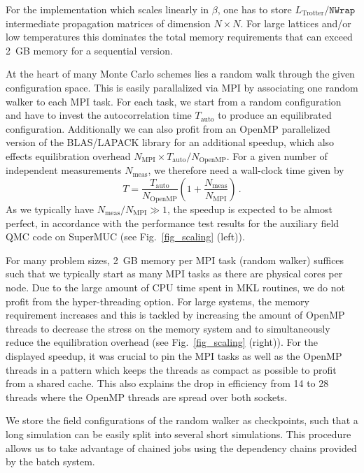 For the implementation which scales linearly in $\beta$, one has to store $L_{\text{Trotter}}/\texttt{NWrap}$ intermediate propagation matrices of dimension $N\times N$. For large lattices and/or low temperatures this dominates the total memory requirements that can exceed 2~GB memory for a sequential version.

At the heart of many Monte Carlo schemes lies a random walk through the given configuration space. This is easily parallalized via MPI by associating one random walker to each MPI task. For each task, we start from a random configuration and have to invest the autocorrelation time $T_\mathrm{auto}$ to produce an equilibrated configuration.
Additionally we can also profit from an OpenMP parallelized version of the BLAS/LAPACK library for an additional speedup, which also effects equilibration overhead $N_\text{MPI}\times T_\text{auto} / N_\text{OpenMP}$. For a given number of independent measurements  $N_\text{meas}$, we  therefore need a wall-clock time given by
\begin{equation}\label{eqn:scaling}
T  =  \frac{T_\text{auto}}{N_\text{OpenMP}} \left( 1   +    \frac{N_\text{meas}}{N_\text{MPI}}  \right) \,.
\end{equation}
As we typically have $ N_\text{meas}/N_\text{MPI} \gg 1 $, 
the speedup is expected to be almost perfect, in accordance with
the performance test results for the auxiliary field
QMC code  on SuperMUC (see Fig.~\ref{fig_scaling} (left)).

For many problem sizes, 2~GB memory per MPI task (random walker) suffices such that we typically start as many MPI tasks as there are physical cores per node. Due to the large amount of CPU time spent in MKL routines, we do not profit from the hyper-threading option. For large systems, the memory requirement increases and this is tackled by increasing the amount of OpenMP threads to decrease the stress on the memory system and to simultaneously reduce the equilibration overhead (see Fig.~\ref{fig_scaling} (right)). For the displayed speedup, it was crucial to pin the MPI tasks as well as the OpenMP threads in a pattern which keeps the threads as compact as possible to profit from a shared cache. This also explains the drop in efficiency from 14 to 28 threads where the OpenMP threads are spread over both sockets. 

We store the field configurations of the random walker as checkpoints, such that a long simulation can be easily split into several short simulations. This procedure allows us to take advantage of chained jobs using the dependency chains provided by the batch system.

